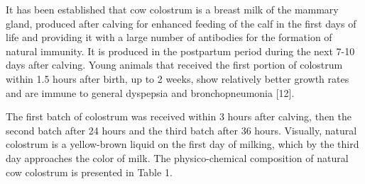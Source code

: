 \begin{multicols}{2}
It has been established that cow colostrum is a breast milk of the
mammary gland, produced after calving for enhanced feeding of the calf
in the first days of life and providing it with a large number of
antibodies for the formation of natural immunity. It is produced in the
postpartum period during the next 7-10 days after calving. Young animals
that received the first portion of colostrum within 1.5 hours after
birth, up to 2 weeks, show relatively better growth rates and are immune
to general dyspepsia and bronchopneumonia {[}12{]}.

The first batch of colostrum was received within 3 hours after calving,
then the second batch after 24 hours and the third batch after 36 hours.
Visually, natural colostrum is a yellow-brown liquid on the first day of
milking, which by the third day approaches the color of milk. The
physico-chemical composition of natural cow colostrum is presented in
Table 1.
\end{multicols}

\begin{table}[H]
\caption*{Table 1- Physico-chemical composition of natural cow colostrum}
\centering
{}
\end{table}

